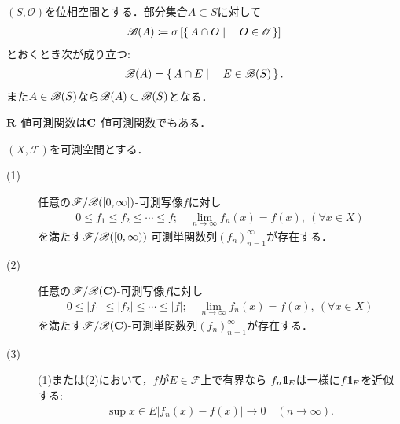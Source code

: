 	\begin{screen}
		\begin{thm}[和・積・商の可測性]
			
		\end{thm}
	\end{screen}
	
	\begin{screen}
		\begin{thm}[相対位相のBorel集合族]\label{thm:Borel_algebra_of_relative_topology}
			$(S,\mathscr{O})$を位相空間とする．部分集合$A \subset S$に対して
			\begin{align}
				\mathscr{B}(A) \coloneqq \sigma\left[ \left\{\, A \cap O \mid \quad O \in \mathscr{O}\, \right\} \right]
			\end{align}
			とおくとき次が成り立つ:
			\begin{align}
				\mathscr{B}(A) = \left\{\, A \cap E \mid \quad E \in \mathscr{B}(S)\, \right\}.
			\end{align}
			また$A \in \mathscr{B}(S)$なら$\mathscr{B}(A) \subset \mathscr{B}(S)$となる．
		\end{thm}
	\end{screen}
	
	$\mathbf{R}$-値可測関数は$\mathbf{C}$-値可測関数でもある．
	
	\begin{screen}
		\begin{thm}[単関数近似列の存在]
			$(X,\mathscr{F})$を可測空間とする．
			\begin{description} 
				\item[(1)] 任意の$\mathscr{F}/\mathscr{B}([0,\infty])$-可測写像$f$に対し
					\begin{align}
						0 \leq f_1 \leq f_2 \leq \cdots \leq f;
						\quad \lim_{n \to \infty} f_n(x) = f(x),\ (\forall x \in X)
					\end{align}
					を満たす$\mathscr{F}/\mathscr{B}([0,\infty))$-可測単関数列$(f_n)_{n=1}^\infty$が存在する．
					
				\item[(2)]
					 任意の$\mathscr{F}/\mathscr{B}(\mathbf{C})$-可測写像$f$に対し
					\begin{align}
						0 \leq |f_1| \leq |f_2| \leq \cdots \leq |f|;
						\quad \lim_{n \to \infty} f_n(x) = f(x),\ (\forall x \in X)
					\end{align}
					を満たす$\mathscr{F}/\mathscr{B}(\mathbf{C})$-可測単関数列$(f_n)_{n=1}^\infty$が存在する．
				
				\item[(3)] (1)または(2)において，$f$が$E \in \mathscr{F}$上で有界なら
					$f_n \mbox{1}\hspace{-0.25em}\mbox{l}_E$は一様に$f \mbox{1}\hspace{-0.25em}\mbox{l}_E$を近似する:
					\begin{align}
						\sup{x \in E}{\left| f_n(x) - f(x) \right|} \longrightarrow 0
						\quad (n \longrightarrow \infty).
					\end{align}
			\end{description}
		\end{thm}
	\end{screen}
	
